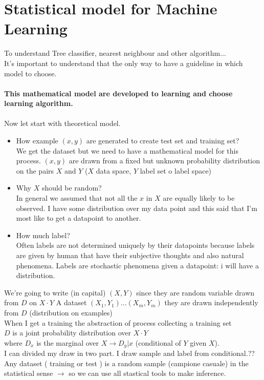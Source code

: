 \documentclass[../main.tex]{subfiles}
\begin{document}
\section{Statistical model for Machine Learning}

To understand Tree classifier, nearest neighbour and other algorithm...\\
It’s important to understand that the only way to have a guideline in which
model to choose.\\\\
\textbf{This mathematical model are developed to learning and choose learning
algorithm.}\\\\
Now let start with theoretical model.
\begin{itemize}
\item How example $(x,y)$ are generated to create test set and training set?\\
We get the dataset but we need to have a mathematical model for this
process.
$(x,y)$ are drawn from a fixed but unknown probability distribution on the pairs $X$
and $Y$ ($X$ data space, $Y$ label set o label space)
\item Why $X$ should be random? \\
In general we assumed that not all the $x$ in $X$ are equally likely to be observed.
I have some distribution over my data point and this said that I’m most like to
get a datapoint to another.
\item How much label?\\
Often labels are not determined uniquely by their datapoints because labels
are given by human that have their subjective thoughts and also natural
phenomena. Labels are stochastic phenomena given a datapoint: i will have a
distribution.
\end{itemize}
We’re going to write (in capital) $(X, Y)$ since they are random variable drawn
from $D$ on $X \cdot Y$
A dataset $(X_1, Y_1) ... (X_m, Y_m)$ they are drawn independently from $D$
(distribution on examples)\\
When I get a training the abstraction of process collecting a training set\\
$D$ is a joint probability distribution over $X\cdot Y$\\
where $D_x$ is the marginal over $X \rightarrow D_y|x$ (conditional of $Y$ given $X$).\\
I can divided my draw in two part.
I draw sample and label from conditional.??\\
Any dataset ( training or test ) is a random sample (campione casuale) in the
statistical sense $\longrightarrow$ so we can use all stastical tools to make inference.
\end{document}
